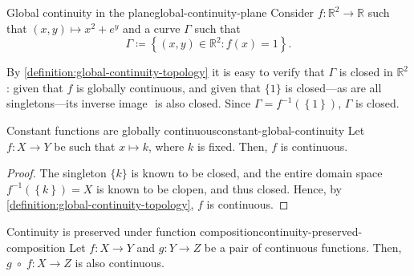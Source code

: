 \documentclass{article}
\DeclareMathOperator\fcomp{\,\circ\,}
\numberwithin{equation}{section}
\numberwithin{figure}{section}
\begin{document}
\begin{example}{Global continuity in the plane}{global-continuity-plane}
    Consider $ f \colon \mathbb{R}^2 \to \mathbb{R} $ such that $ (x, y) \mapsto
    x^2 + e^y $ and a curve $ \Gamma $ such that
    \begin{equation}
        \Gamma \coloneq \left\{ (x, y) \in \mathbb{R}^2 \colon f(x) = 1
        \right\}.
    \end{equation}

    \begingroup
        \tikzset{external/export=true}
        \centering
        \hspace*{-2em}\qquad
    \endgroup

    By \cref{definition:global-continuity-topology} it is easy to verify that $
    \Gamma $ is closed in $ \mathbb{R}^2 $: given that $ f $ is globally
    continuous, and given that $ \{ 1 \} $ is closed---as are all
    singletons---its inverse image $  $ is
    also closed. Since $ \Gamma = f^{-1}\left(\left\{1\right\}\right) $, $
    \Gamma $ is closed.
\end{example}
\begin{theorem}{Constant functions are globally
        continuous}{constant-global-continuity}
    Let $ f \colon X \to Y $ be such that $ x \mapsto k $, where $ k $ is fixed.
    Then, $ f $ is continuous.
    \begin{proof}
        The singleton $ \{ k \} $ is known to be closed, and the entire domain
        space $ f^{-1}\left(\left\{ k \right\}\right) = X $ is known to be
        clopen, and thus closed. Hence, by
        \cref{definition:global-continuity-topology}, $ f $ is continuous.
    \end{proof}
\end{theorem}
\begin{theorem}{Continuity is preserved under function
        composition}{continuity-preserved-composition}
    Let $ f \colon X \to Y $ and $ g \colon Y \to Z $ be a pair of continuous
    functions. Then, $ g \fcomp f \colon X \to Z $ is also continuous.
\end{theorem}
\end{document}
